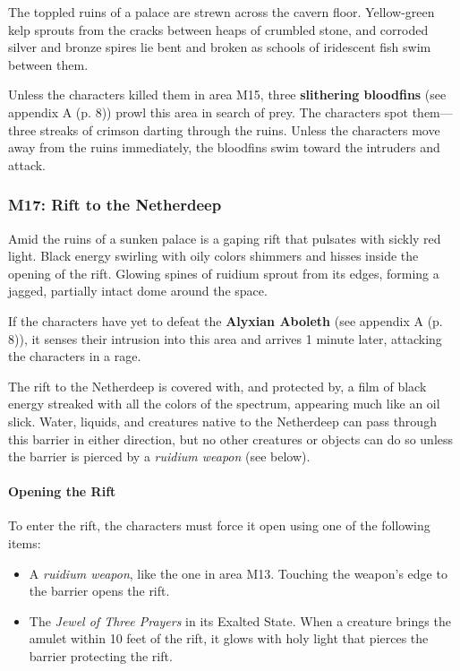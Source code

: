 \documentclass[a4paper, 11pt, bg=full, twocolumn, nooutline]{dndbook}
\begin{document}
\begin{DndReadAloud}
The toppled ruins of a palace are strewn across the cavern floor. Yellow-green kelp sprouts from the cracks between heaps of crumbled stone, and corroded silver and bronze spires lie bent and broken as schools of iridescent fish swim between them.
\end{DndReadAloud}

Unless the characters killed them in area M15, three \textbf{slithering bloodfins} (see appendix A (p. 8)) prowl this area in search of prey. The characters spot them---three streaks of crimson darting through the ruins. Unless the characters move away from the ruins immediately, the bloodfins swim toward the intruders and attack.

\subsubsection{M17: Rift to the Netherdeep}

\begin{DndReadAloud}
Amid the ruins of a sunken palace is a gaping rift that pulsates with sickly red light. Black energy swirling with oily colors shimmers and hisses inside the opening of the rift. Glowing spines of ruidium sprout from its edges, forming a jagged, partially intact dome around the space.
\end{DndReadAloud}

If the characters have yet to defeat the \textbf{Alyxian Aboleth} (see appendix A (p. 8)), it senses their intrusion into this area and arrives 1 minute later, attacking the characters in a rage.

The rift to the Netherdeep is covered with, and protected by, a film of black energy streaked with all the colors of the spectrum, appearing much like an oil slick. Water, liquids, and creatures native to the Netherdeep can pass through this barrier in either direction, but no other creatures or objects can do so unless the barrier is pierced by a \textit{ruidium weapon} (see below).

\paragraph{Opening the Rift}

To enter the rift, the characters must force it open using one of the following items:

\begin{itemize}
\item A \textit{ruidium weapon}, like the one in area M13. Touching the weapon's edge to the barrier opens the rift.
\item The \textit{Jewel of Three Prayers} in its Exalted State. When a creature brings the amulet within 10 feet of the rift, it glows with holy light that pierces the barrier protecting the rift.
\end{itemize}
\end{document}
